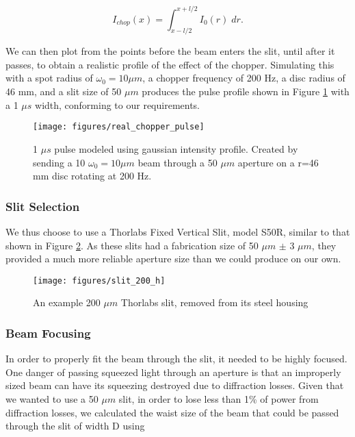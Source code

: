 \begin{equation}
  \label{eq:i_chop}
  I_{chop}(x) = \int^{x+l/2}_{x-l/2} I_0(r) \; dr.
\end{equation}

\noindent
We can then plot  from the points before the beam enters the slit, until after it passes, to obtain a realistic profile of the effect of the chopper.  Simulating this with a spot radius of $\omega_0 = 10 \mu m$, a chopper frequency of 200 Hz, a disc radius of 46 mm, and a slit size of 50 $\mu m$ produces the pulse profile shown in Figure \ref{fig:real_chopper_pulse} with a 1 $\mu s$ width, conforming to our requirements.

\begin{figure}[!ht] 
 \centering 
 \texttt{[image: figures/real\_chopper\_pulse]} 
 \caption[Chopper pulse model with gaussian profile]{1 $\mu s$ pulse modeled using gaussian intensity profile.  Created by sending a 10 $\omega_0=10 \mu m$ beam through a 50 $\mu m$ aperture on a r=46 mm disc rotating at 200 Hz.} 
 \label{fig:real_chopper_pulse} 
\end{figure}





\subsubsection{Slit Selection}
\label{slit_selection} 

We thus choose to use a Thorlabs Fixed Vertical Slit, model S50R, similar to that shown in Figure \ref{fig:thorlabs_slit}.  As these slits had a fabrication size of 50 $\mu m$  $\pm$ 3 $\mu m$, they provided a much more reliable aperture size than we could produce on our own.

\begin{figure}[!ht] 
 \centering 
 \texttt{[image: figures/slit\_200\_h]} 
 \caption[Thorlabs 200 $\mu m$ slit]{An example 200 $\mu m$ Thorlabs slit, removed from its steel housing} 
 \label{fig:thorlabs_slit} 
\end{figure}

\subsubsection{Beam Focusing}
\label{beam_focusing} 

In order to properly fit the beam through the slit, it needed to be highly focused.  One danger of passing squeezed light through an aperture is that an improperly sized beam can have its squeezing destroyed due to diffraction losses.  Given that we wanted to use a 50 $\mu m$ slit, in order to lose less than 1\% of power from diffraction losses, we calculated the waist size of the beam that could be passed through the slit of width D using \cite{Siegman86}

